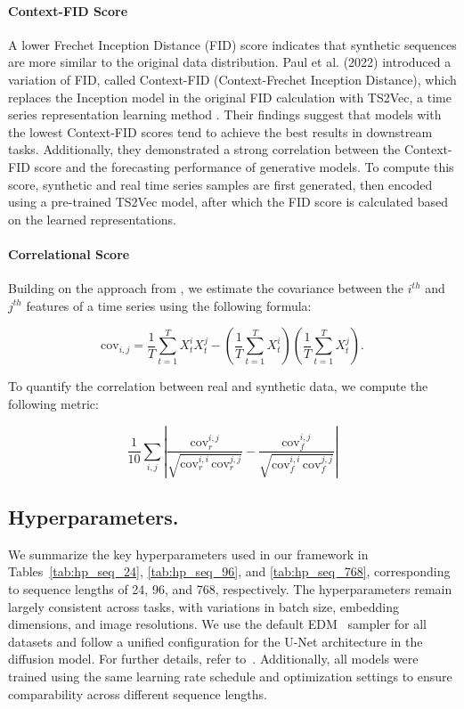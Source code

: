 \documentclass{article}
\theoremstyle{plain}
\theoremstyle{definition}
\theoremstyle{remark}
\begin{document}
\paragraph{Context-FID Score}
A lower Frechet Inception Distance (FID) score indicates that synthetic sequences are more similar to the original data distribution. Paul et al. (2022) introduced a variation of FID, called Context-FID (Context-Frechet Inception Distance), which replaces the Inception model in the original FID calculation with TS2Vec, a time series representation learning method \cite{yue2022ts2vec}. Their findings suggest that models with the lowest Context-FID scores tend to achieve the best results in downstream tasks. Additionally, they demonstrated a strong correlation between the Context-FID score and the forecasting performance of generative models. To compute this score, synthetic and real time series samples are first generated, then encoded using a pre-trained TS2Vec model, after which the FID score is calculated based on the learned representations.

\paragraph{Correlational Score}
Building on the approach from \cite{liao2020conditional}, we estimate the covariance between the $i^{th}$ and $j^{th}$ features of a time series using the following formula:

\[
\text{cov}_{i,j} = \frac{1}{T} \sum_{t=1}^{T} X_t^{i} X_t^{j} - \left( \frac{1}{T} \sum_{t=1}^{T} X_t^{i} \right) \left( \frac{1}{T} \sum_{t=1}^{T} X_t^{j} \right).
\]

To quantify the correlation between real and synthetic data, we compute the following metric:

\[
\frac{1}{10} \sum_{i,j} \left| \frac{\text{cov}_r^{i,j}}{\sqrt{\text{cov}_r^{i,i} \, \text{cov}_r^{j,j}}} - \frac{\text{cov}_f^{i,j}}{\sqrt{\text{cov}_f^{i,i} \, \text{cov}_f^{j,j}}} \right|
\]


\subsection{Hyperparameters.}
We summarize the key hyperparameters used in our framework in Tables~\ref{tab:hp_seq_24}, \ref{tab:hp_seq_96}, and \ref{tab:hp_seq_768}, corresponding to sequence lengths of 24, 96, and 768, respectively. The hyperparameters remain largely consistent across tasks, with variations in batch size, embedding dimensions, and image resolutions. We use the default EDM~\cite{karras2022elucidating} sampler for all datasets and follow a unified configuration for the U-Net architecture in the diffusion model. For further details, refer to~\cite{karras2022elucidating}. Additionally, all models were trained using the same learning rate schedule and optimization settings to ensure comparability across different sequence lengths.
\end{document}
